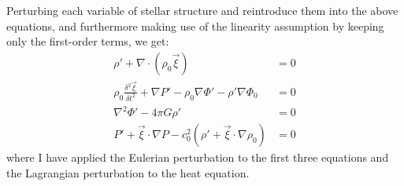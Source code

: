 Perturbing each variable of stellar structure and reintroduce them into the above equations, and furthermore making use of the linearity assumption by keeping only the first-order terms, we get: 
\begin{align}
    \rho' 
    + 
    \nabla \cdot \left( 
        \rho_0 \vec\xi 
    \right) 
    &= 
    0 
    \\
    \rho_0
    \frac{\delta^2 \vec\xi}{\delta t^2}
    +
    \nabla P'
    -
    \rho_0 \nabla \Phi'
    -
    \rho' \nabla \Phi_0
    &=
    0
    \\
    \nabla^2 \Phi'
    -
    4\pi G \rho'
    &=
    0
    \\
    P'
    +
    \vec \xi \cdot \nabla P
    -
    c^2_0 \left( 
        \rho' + \vec \xi \cdot \nabla \rho_0
    \right)
    &=
    0
\end{align}
where I have applied the Eulerian perturbation to the first three equations and the Lagrangian perturbation to the heat equation. 
\fi

